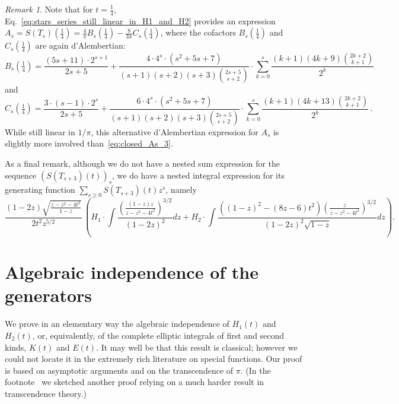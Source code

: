 \documentclass[12pt]{amsart}
\newcommand{\revision}[1]{{#1}}
\theoremstyle{plain}
\theoremstyle{remark}
\newtheorem{remark}[lemma]{Remark}
\begin{document}
\begin{remark}
\revision{
Note that for $t=\frac14$, Eq.~\eqref{eq:stars_series_still_linear_in_H1_and_H2} provides an expression 
$A_s=S(T_s)(\tfrac14) = \frac{4}{\pi} B_s(\tfrac14) -  \frac{8}{3\pi} C_s(\tfrac14)$, 
where the cofactors $B_s(\tfrac14)$ and $C_s(\tfrac14)$ are again d'Alembertian:
\[
B_s(\tfrac14)
=
\frac{ \left(5 s +11\right) \cdot 2^{s +1}}{2 s +5}
+
\frac{4 \cdot 4^s \cdot \left(s^2+5 s +7\right)}{\left(s +1\right) \left(s +2\right) \left(s +3\right) \binom{2 s +5}{s +2}} \cdot \sum_{k=0}^s \frac{\left(k +1\right) \left(4 k +9\right) \binom{2 k +2}{k +1}}{2^k}
\]
and
\[
C_s(\tfrac14) =
 \frac{3 \cdot \left(s -1\right) \cdot  2^{s}}{2 s +5}
 + \frac{6 \cdot 4^s \cdot  \left(s^2 +5 s +7\right)}{\left(s +1\right) \left(s +2\right) \left(s +3\right) \binom{2 s +5}{s +2}}
 \cdot  \sum_{k=0}^s \frac{\left(k +1\right) \left(4 k +13\right) \binom{2 k +2}{k +1}}{2^k}
\,  .
 \]
 While still linear 
in $1/\pi$, this alternative d'Alembertian expression for $A_s$ is slightly more involved  
than~\eqref{eq:closed_As_3}.
}

\revision{
As a final remark, although we do not have a nested sum expression for the sequence $ (S(T_{s+3})(t))_s$, we do have a nested integral expression for its generating function 
\(\sum_{s \geq 0} S(T_{s+3})(t) z^s \), namely
\[
\frac{\left(1-2 z\right) \sqrt{\frac{z-z^{2}-4 t^{2}}{1-z}}}{2 t^{2} z^{{5}/{2}}}
\, \left(H_1 \cdot {\int}\frac{\left(\frac{\left(1-z\right) z}{ z-z^{2}-4t^{2}}\right)^{{3}/{2}}}{\left(1-2 z\right)^{2}} {d}z + H_2 \cdot {\int}\frac{\left((1-z)^2-(8 z -6) t^{2}\right) \left(\frac{z}{z-z^{2}-4 t^{2}}\right)^{{3}/{2}}}{\left(1-2 z\right)^{2} \sqrt{1-z }}{d}z \right) .
\]
}
\end{remark}	

\appendix
{}

\section{Algebraic independence of the generators}
\label{appendix:alg_independence}

We prove in an elementary way the algebraic independence of $H_1(t)$ and $H_2(t)$, or, equivalently, of the complete elliptic integrals of first and second kinds, $K(t)$ and $E(t)$.
It may well be that this result is classical; however we could not locate it in the extremely rich literature on special functions.
Our proof is based on asymptotic arguments and on the transcendence of $\pi$.
(In the footnote~ we sketched another proof relying on a much harder result in transcendence theory.)
\end{document}
